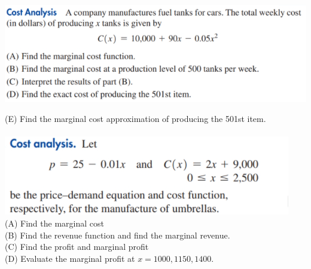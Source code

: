 \documentclass[12pt]{extarticle}
\begin{document}
\begin{center}
	\includegraphics[width=1\linewidth]{9-7-7}
\end{center}
(E) Find the marginal cost approximation of producing the 501st item.
\\
\\
\includegraphics[width=0.75\linewidth]{9-r-1}
\\
(A) Find the marginal cost\\
(B) Find the revenue function and find the marginal revenue.\\
(C) Find the profit and marginal profit\\
(D) Evaluate the marginal profit at $x=1000, 1150, 1400$.

\cleardoublepage
\end{document}
